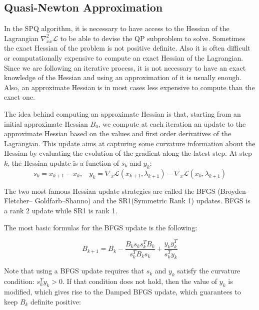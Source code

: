 \subsection{Quasi-Newton Approximation}
\label{sub:quasi_newton_approximation}

In the SPQ algorithm, it is necessary to have access to the Hessian of the Lagrangian $\nabla_{xx}^2\mathcal{L}$ to be able to devise the QP subproblem to solve.
Sometimes the exact Hessian of the problem is not positive definite.
Also it is often difficult or computationally expensive to compute an exact Hessian of the Lagrangian.
Since we are following an iterative process, it is not necessary to have an exact knowledge of the Hessian and using an approximation of it is usually enough.
Also, an approximate Hessian is in most cases less expensive to compute than the exact one.

The idea behind computing an approximate Hessian is that, starting from an initial approximate Hessian $B_0$, we compute at each iteration an update to the approximate Hessian based on the values and first order derivatives of the Lagrangian.
This update aims at capturing some curvature information about the Hessian by evaluating the evolution of the gradient along the latest step.
At step $k$, the Hessian update is a function of $s_k$ and $y_k$:
\begin{equation}
  s_k = x_{k+1}-x_k,\ \ \ \
  y_k = \nabla_x\mathcal{L}(x_{k+1}, \lambda_{k+1}) - \nabla_x\mathcal{L}(x_{k}, \lambda_{k+1})
\end{equation}

The two most famous Hessian update strategies are called the BFGS (Broyden–Fletcher– Goldfarb–Shanno) and the SR1(Symmetric Rank 1) updates.
BFGS is a rank 2 update while SR1 is rank 1.

The most basic formulas for the BFGS update is the following:

\begin{equation}
\label{BFGS}
  B_{k+1} = B_k - \frac{B_k s_k s_k^T B_k}{s_k^T B_k s_k} + \frac{y_k y_k^T}{s_k^T y_k}
\end{equation}

Note that using a BFGS update requires that $s_k$ and $y_k$ satisfy the curvature condition: $s_k^T y_k>0$.
If that condition does not hold, then the value of $y_k$ is modified, which gives rise to the Damped BFGS update, which guarantees to keep $B_k$ definite positive:

